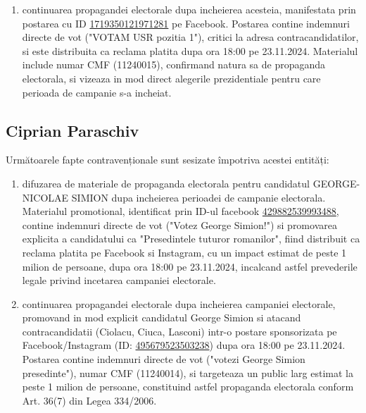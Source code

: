\documentclass[a4paper,12pt]{article}
\begin{document}
\begin{enumerate}[leftmargin=*, label=\arabic*.)]
    \item continuarea propagandei electorale dupa incheierea acesteia, manifestata prin postarea cu ID \href{https://www.facebook.com/ads/library/?id=1719350121971281}{1719350121971281} pe Facebook. Postarea contine indemnuri directe de vot ("VOTAM USR  pozitia 1"), critici la adresa contracandidatilor, si este distribuita ca reclama platita dupa ora 18:00 pe 23.11.2024. Materialul include numar CMF (11240015), confirmand natura sa de propaganda electorala, si vizeaza in mod direct alegerile prezidentiale pentru care perioada de campanie s-a incheiat.
\end{enumerate}

\vspace{0.5cm}

\subsection{Ciprian Paraschiv}
Următoarele fapte contravenționale sunt sesizate împotriva acestei entități:

\begin{enumerate}[leftmargin=*, label=\arabic*.)]
    \item difuzarea de materiale de propaganda electorala pentru candidatul GEORGE-NICOLAE SIMION dupa incheierea perioadei de campanie electorala. Materialul promotional, identificat prin ID-ul facebook \href{https://www.facebook.com/ads/library/?id=429882539993488}{429882539993488}, contine indemnuri directe de vot ("Votez George Simion!") si promovarea explicita a candidatului ca "Presedintele tuturor romanilor", fiind distribuit ca reclama platita pe Facebook si Instagram, cu un impact estimat de peste 1 milion de persoane, dupa ora 18:00 pe 23.11.2024, incalcand astfel prevederile legale privind incetarea campaniei electorale.
    \item continuarea propagandei electorale dupa incheierea campaniei electorale, promovand in mod explicit candidatul George Simion si atacand contracandidatii (Ciolacu, Ciuca, Lasconi) intr-o postare sponsorizata pe Facebook/Instagram (ID: \href{https://www.facebook.com/ads/library/?id=495679523503238}{495679523503238}) dupa ora 18:00 pe 23.11.2024. Postarea contine indemnuri directe de vot ("votezi George Simion presedinte"), numar CMF (11240014), si targeteaza un public larg estimat la peste 1 milion de persoane, constituind astfel propaganda electorala conform Art. 36(7) din Legea 334/2006.
\end{enumerate}
\end{document}
